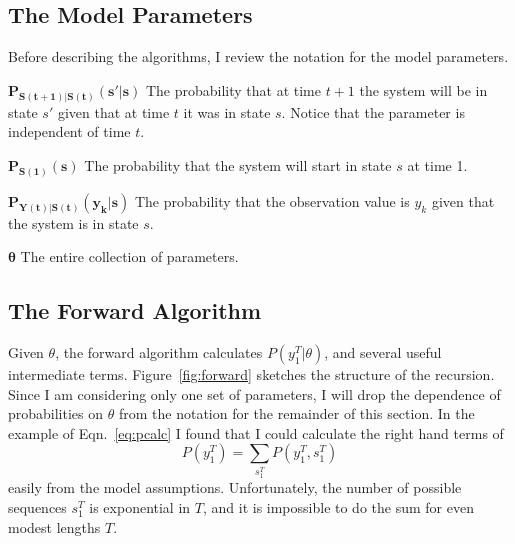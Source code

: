 \documentclass[]{article}
\newcommand{\parameters}{\theta}
\newcommand{\ts}[3]{#1_{#2}^{#3}}                    %
\newcommand{\ti}[2]{{#1}{(#2)}}                  %
\newenvironment{symbdescription}{%
  \list{}{%
    \labelwidth\nomlabelwidth
    \leftmargin\labelwidth
    \advance\leftmargin\labelsep
    \itemsep\nomitemsep
    \let\makelabel\nomlabel}}%
{\endlist}
\begin{document}
\subsection{The Model Parameters}\label{sec:parameters}

Before describing the algorithms, I review the notation for the model
parameters.  \setlength{\nomlabelwidth}{2.7cm}%
\begin{symbdescription}
\item[$\bm{P_{\ti{S}{t+1}|\ti{S}{t}}(s'|s)}$] The probability that
  at time $t+1$ the system will be in state $s'$ given that at time
  $t$ it was in state $s$.  Notice that the parameter is independent
  of time $t$.
\item[$\bm{P_{\ti{S}{1}}(s)}$] The probability that the system will
  start in state $s$ at time 1.
\item[$\bm{P_{\ti{Y}{t}|\ti{S}{t}}(y_k|s)}$] The probability that
  the observation value is $y_k$ given that the system is in state $s$.
\item[$\bm{\parameters}$] The entire collection of parameters.
\end{symbdescription}

\subsection{The Forward Algorithm}\label{sec:forward} 

Given $\parameters$, the forward algorithm calculates
$P(\ts{y}{1}{T}|\parameters)$, and several useful intermediate terms.
Figure~\ref{fig:forward} sketches the structure of the recursion.
Since I am considering only one set of parameters, I will drop the
dependence of probabilities on $\parameters$ from the notation for the
remainder of this section.  In the example of Eqn.~\eqref{eq:pcalc} I
found that I could calculate the right hand terms of
\begin{equation*}
   P\left( \ts{y}{1}{T} \right) = \sum_{\ts{s}{1}{T}}
   P\left( \ts{y}{1}{T},\ts{s}{1}{T} \right)
\end{equation*}
easily from the model assumptions.  Unfortunately, the number of
possible sequences $\ts{s}{1}{T}$ is exponential in $T$, and it is
impossible to do the sum for even modest lengths $T$.
\end{document}
